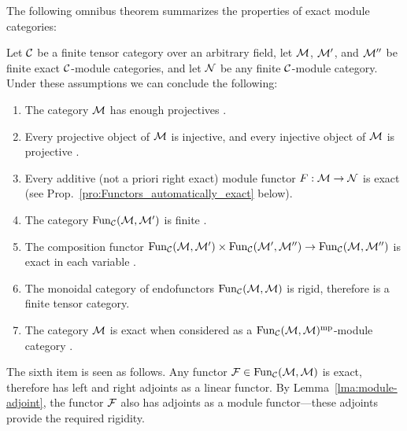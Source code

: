 \documentclass{amsart}
\begin{document}
The following omnibus theorem summarizes the properties of exact module categories: 
\begin{theorem} \label{Thm:ExactModCatOmnibus}
	Let $\mathcal C$ be a finite tensor category over an arbitrary field, let $\mathcal M$, $\mathcal M'$, and $\mathcal M''$ be finite exact $\mathcal C$-module categories, and let $\mathcal N$ be any finite $\mathcal C$-module category.  Under these assumptions we can conclude the following:
	\begin{enumerate}
		\item The category $\mathcal M$ has enough projectives \cite[Lemma 3.4]{EO-ftc} \cite[Lemma 2.7.1]{EGNO}.
		\item Every projective object of $\mathcal M$ is injective, and every injective object of $\mathcal M$ is projective \cite[Cor. 3.6]{EO-ftc} \cite[Cor 2.7.4]{EGNO}.
		\item Every additive (not a priori right exact) module functor $F:\mathcal M \to \mathcal N$ is exact \cite[Prop. 3.11]{EO-ftc} \cite[Prop 2.7.8]{EGNO} (see Prop.~\ref{pro:Functors_automatically_exact} below).		
		\item The category $\operatorname{Fun}_{\mathcal C}(\mathcal M, \mathcal M')$ is finite \cite[Prop 2.13.5]{EGNO}. %
		\item The composition functor $\operatorname{Fun}_{\mathcal C}(\mathcal M, \mathcal M') \times \operatorname{Fun}_{\mathcal C}(\mathcal M', \mathcal M'') \to \operatorname{Fun}_{\mathcal C}(\mathcal M, \mathcal M'')$ is exact in each variable \cite[Lemma 3.20]{EO-ftc} \cite[Lemma 2.13.2]{EGNO}.	
		\item The monoidal category of endofunctors $\operatorname{Fun}_{\mathcal C}(\mathcal M,\mathcal M)$ is rigid, therefore is a finite tensor category.
		\item The category $\mathcal M$ is exact when considered as a $\operatorname{Fun}_{\mathcal C}(\mathcal M,\mathcal M)^{\mathrm{mp}}$-module category \cite[Lemma 3.25]{EO-ftc}.
\CSP{}
	\end{enumerate}
\end{theorem}
\nid {}

\nid The sixth item is seen as follows.  Any functor $\mathcal F \in \operatorname{Fun}_\mathcal C(\mathcal M,\mathcal M)$ is exact, therefore has left and right adjoints as a linear functor.  By Lemma~\ref{lma:module-adjoint}, the functor $\mathcal F$ also has adjoints as a module functor---these adjoints provide the required rigidity.  
\end{document}
